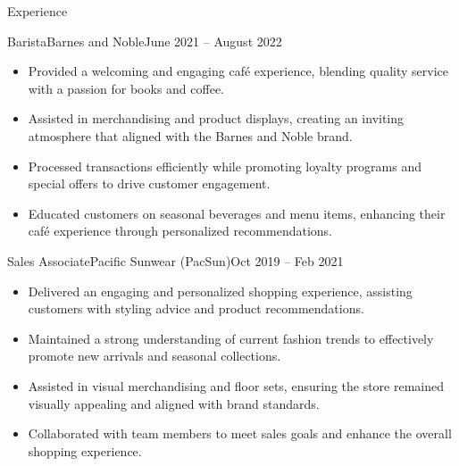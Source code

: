 \documentclass[]{mcdowellcv}
\begin{document}
\begin{cvsection}{Experience}
		\begin{cvsubsection}{Barista}{Barnes and Noble}{June 2021 -- August 2022}	
			\begin{itemize}
				\item Provided a welcoming and engaging café experience, blending quality service with a passion for books and coffee.
				\item Assisted in merchandising and product displays, creating an inviting atmosphere that aligned with the Barnes and Noble brand.
				\item Processed transactions efficiently while promoting loyalty programs and special offers to drive customer engagement.
				\item Educated customers on seasonal beverages and menu items, enhancing their café experience through personalized recommendations.
			\end{itemize}
		\end{cvsubsection}

		\begin{cvsubsection}{Sales Associate}{Pacific Sunwear (PacSun)}{Oct 2019 -- Feb 2021}	
			\begin{itemize}
				\item Delivered an engaging and personalized shopping experience, assisting customers with styling advice and product recommendations.
				\item Maintained a strong understanding of current fashion trends to effectively promote new arrivals and seasonal collections.
				\item Assisted in visual merchandising and floor sets, ensuring the store remained visually appealing and aligned with brand standards.
				\item Collaborated with team members to meet sales goals and enhance the overall shopping experience.
			\end{itemize}
		\end{cvsubsection}
	\end{cvsection}
	
\end{document}
